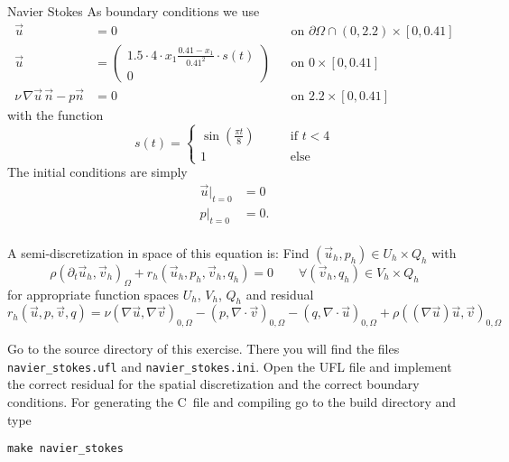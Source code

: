 \documentclass[12pt,a4paper]{article}
\def\CC{{C\nolinebreak[4]\hspace{-.05em}\raisebox{.4ex}{\tiny\bf ++}}}
\begin{document}
\begin{Exercise}{Navier Stokes}
  As boundary conditions we use
  \begin{align*}
    \vec{u} &= 0 && \text{on $\partial\Omega \cap (0,2.2)\times[0,0.41]$} \\
    \vec{u} &=
    \begin{pmatrix}
      1.5 \cdot 4 \cdot x_1 \frac{0.41-x_1}{0.41^2} \cdot s(t) \\ 0
    \end{pmatrix} && \text{on $0\times[0,0.41]$}\\
    \nu \, \nabla \vec{u} \, \vec{n} - p\vec{n} &= 0 && \text{on $2.2\times[0,0.41]$}
  \end{align*}
  with the function
  \begin{equation*}
    s(t) =
    \begin{cases}
      \sin\left(\frac{\pi t}{8}\right) \qquad &\text{if $t<4$}\\
      1 \qquad &\text{else}
    \end{cases}
  \end{equation*}
  The initial conditions are simply
  \begin{align*}
    \vec{u}|_{t=0} &= 0 \\
    p|_{t=0} &= 0. \\
  \end{align*}

  A semi-discretization in space of this equation is: Find
  $(\vec{u}_h,p_h) \in U_h\times Q_h$ with
  \begin{equation*}
    \rho (\partial_t \vec{u}_h, \vec{v}_h)_\Omega + r_h(\vec{u}_h, p_h, \vec{v}_h, q_h) = 0 \qquad \forall (\vec{v}_h,q_h) \in V_h\times Q_h
  \end{equation*}
  for appropriate function spaces $U_h$, $V_h$, $Q_h$ and residual
  \begin{equation}
    r_h(\vec{u},p,\vec{v},q)
    = \nu (\nabla \vec{u}, \nabla \vec{v})_{0,\Omega}
    - (p, \nabla \cdot \vec{v})_{0,\Omega}
    - (q, \nabla \cdot \vec{u})_{0, \Omega}
    + \rho ((\nabla \vec{u}) \vec{u}, \vec{v})_{0, \Omega}
    \label{eq:ns-residual}
  \end{equation}

  Go to the source directory of this exercise. There you will find the files
  \lstinline{navier_stokes.ufl} and \lstinline{navier_stokes.ini}. Open the UFL
  file and implement the correct residual for the spatial discretization and
  the correct boundary conditions. For generating the \CC\ file and compiling
  go to the build directory and type
  \begin{lstlisting}
make navier_stokes
  \end{lstlisting}


\end{Exercise}
\end{document}
